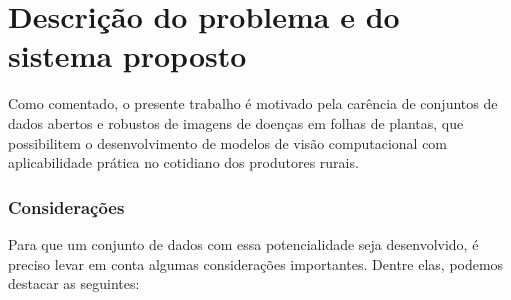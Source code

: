 \chapter{Descrição do problema e do sistema proposto}
Como comentado, o presente trabalho é motivado pela carência de conjuntos de dados abertos e robustos de imagens de doenças em folhas de plantas, que possibilitem o desenvolvimento de modelos de visão computacional com aplicabilidade prática no cotidiano dos produtores rurais.

\subsection{Considerações}
Para que um conjunto de dados com essa potencialidade seja desenvolvido, é preciso levar em conta algumas considerações importantes. Dentre elas, podemos destacar as seguintes:


